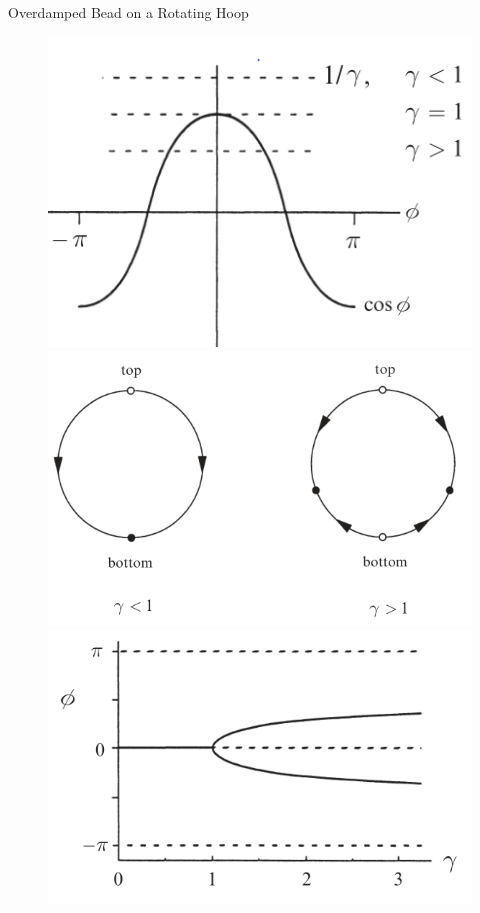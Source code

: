 \documentclass[9pt,aspectratio=43,mathserif,table]{beamer}
\begin{document}
\begin{frame}{Overdamped Bead on a Rotating Hoop}
\begin{multicols}{2}
    \begin{figure}[!h]
      \centering
      \includegraphics[width=.3\textwidth]{fig/overdamped-gamma.PNG}
      \includegraphics[width=.3\textwidth]{fig/overdamped-gamma2.PNG}
      \includegraphics[width=.3\textwidth]{fig/overdamped-gamma-bifur.PNG}
    \end{figure}
 
  \end{multicols}
 
\end{frame}
\end{document}
